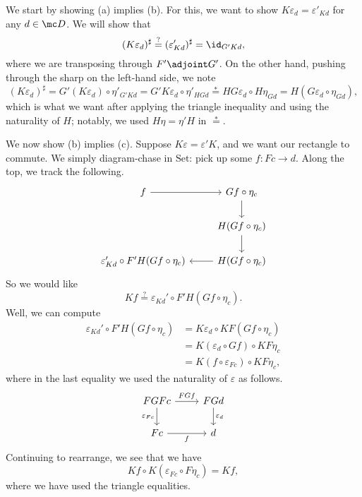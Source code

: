 \documentclass[../notes.tex]{subfiles}
\begin{document}
We start by showing (a) implies (b). For this, we want to show $K\varepsilon_d=\varepsilon'_{Kd}$ for any $d\in\mc D$. We will show that
\[(K\varepsilon_d)^\sharp\stackrel?=(\varepsilon'_{Kd})^\sharp=\id_{G'Kd},\]
where we are transposing through $F'\adjoint G'$. On the other hand, pushing through the sharp on the left-hand side, we note
\[(K\varepsilon_d)^\sharp=G'(K\varepsilon_d)\circ\eta'_{G'Kd}=G'K\varepsilon_d\circ\eta'_{HGd}\stackrel*=HG\varepsilon_d\circ H\eta_{Gd}=H(G\varepsilon_d\circ\eta_{Gd}),\]
which is what we want after applying the triangle inequality and using the naturality of $H$; notably, we used $H\eta=\eta'H$ in $\stackrel*=$.

We now show (b) implies (c). Suppose $K\varepsilon=\varepsilon'K$, and we want our rectangle to commute. We simply diagram-chase in $\mathrm{Set}$: pick up some $f:Fc\to d$. Along the top, we track the following.
\[\begin{tikzcd}
	f & {Gf\circ\eta_c} \\
	& {H(Gf\circ\eta_c)} \\
	{\varepsilon_{Kd}'\circ F'H(Gf\circ\eta_c)} & {H(Gf\circ\eta_c)}
	\arrow[from=1-1, to=1-2]
	\arrow[from=1-2, to=2-2]
	\arrow[from=2-2, to=3-2]
	\arrow[from=3-2, to=3-1]
\end{tikzcd}\]
So we would like 
\[Kf\stackrel?=\varepsilon_{Kd}'\circ F'H(Gf\circ\eta_c).\]
Well, we can compute
\begin{align*}
	\varepsilon_{Kd}'\circ F'H(Gf\circ\eta_c) &= K\varepsilon_{d}\circ KF(Gf\circ\eta_c) \\
	&= K(\varepsilon_{d}\circ Gf)\circ KF\eta_c \\
	&= K(f\circ\varepsilon_{Fc})\circ KF\eta_c,
\end{align*}
where in the last equality we used the naturality of $\varepsilon$ as follows.
\[\begin{tikzcd}
	FGFc & FGd \\
	Fc & d
	\arrow["f"', from=2-1, to=2-2]
	\arrow["FGf", from=1-1, to=1-2]
	\arrow["{\varepsilon_d}", from=1-2, to=2-2]
	\arrow["{\varepsilon_{Fc}}"', from=1-1, to=2-1]
\end{tikzcd}\]
Continuing to rearrange, we see that we have
\[Kf\circ K(\varepsilon_{Fc}\circ F\eta_c)=Kf,\]
where we have used the triangle equalities.
\end{document}
